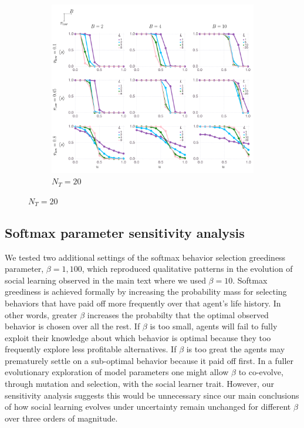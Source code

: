 \documentclass[letterpaper,11.5pt]{scrartcl}
\begin{document}
\newpage
\begin{figure}
  \ContinuedFloat
  \begin{subfigure}{\textwidth}
	\caption{$N_T = 20$}
	\includegraphics[width=\textwidth]{Figures/supplement/nteachers=20/mainResultsPlots.pdf}
  \end{subfigure}
\end{figure}

\clearpage


\subsection{Softmax parameter sensitivity analysis} 

We tested two additional settings of the softmax behavior selection greediness parameter,
$\beta=1,100$, which reproduced qualitative patterns in the evolution of social learning
observed in the main text where we used $\beta=10$.  
Softmax greediness is achieved formally by increasing the
probability mass for selecting behaviors that have paid off more frequently over that agent's
life history. In other words, greater $\beta$ increases the probabilty that the optimal
observed behavior is chosen over all the rest. If $\beta$ is too small, agents will fail to
fully exploit their knowledge about which behavior is optimal because they too frequently
explore less profitable alternatives.  If $\beta$ is too great the agents may prematurely
settle on a sub-optimal behavior because it paid off first.  In a fuller evolutionary
exploration of model parameters one might allow $\beta$ to co-evolve, through
mutation and selection, with the social learner trait.  
However, our sensitivity analysis suggests this would be unnecessary 
since our main conclusions of how social learning evolves under uncertainty remain unchanged for different
$\beta$ over three orders of magnitude.
\end{document}
